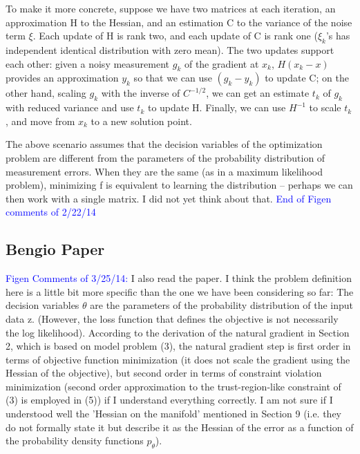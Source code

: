 \documentclass[12pt]{article}
\begin{document}
To make it more concrete, suppose we have two matrices at each iteration, an approximation H to the Hessian, and an estimation C to the variance of the noise term $\xi$.  Each update of H is rank two, and each update of C is rank one ($\xi_k$'s has independent identical distribution with zero mean).  The two updates support each other: given a noisy measurement $g_k$ of the gradient at $x_k$, $H(x_k-x)$ provides an approximation $y_k$ so that we can use $(g_k-y_k)$ to update C; on the other hand, scaling $g_k$ with the inverse of $C^{-1/2}$, we can get an estimate $t_k$ of $g_k$ with reduced variance and use $t_k$ to update H.  Finally, we can use $H^{-1}$ to scale $t_k$, and move from $x_k$ to a new solution point.

The above scenario assumes that the decision variables of the optimization problem are different from the parameters of the probability distribution of measurement errors.  When they are the same (as in a maximum likelihood problem), minimizing f is equivalent to learning the distribution -- perhaps we can then work with a single matrix.  I did not yet think about that.
\textcolor{blue}{End of Figen comments of 2/22/14}


\subsection{Bengio Paper}



\textcolor{blue}{Figen Comments of 3/25/14:} I also read the paper.  I think the problem definition here is a little bit more specific than the one we have been considering so far: The decision variables $\theta$ are the parameters of the probability distribution of the input data z. (However, the loss function that defines the objective is not necessarily the log likelihood).  According to the derivation of the natural gradient in Section 2, which is based on model problem (3), the natural gradient step is first order in terms of objective function minimization (it does not scale the gradient using the Hessian of the objective), but second order in terms of constraint violation minimization (second order approximation to the trust-region-like constraint of (3) is employed in (5)) if I understand everything correctly.  I am not sure if I understood well the 'Hessian on the manifold' mentioned in Section 9 (i.e. they do not formally state it but describe it as the Hessian of the error as a function of the probability density functions $p_\theta$).
\end{document}
